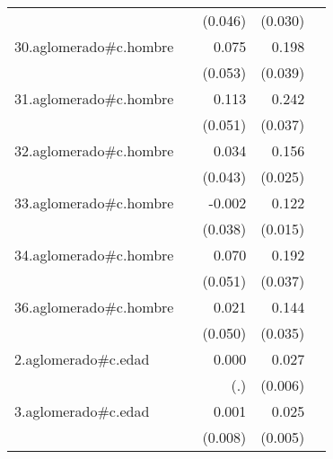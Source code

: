 {\begin{longtable}{l*{4}{D{.}{.}{-1}}}
            &                     &     (0.046)         &     (0.030)         &                     \\
\addlinespace
30.aglomerado#c.hombre&                     &       0.075         &       0.198\sym{***}&                     \\
            &                     &     (0.053)         &     (0.039)         &                     \\
\addlinespace
31.aglomerado#c.hombre&                     &       0.113\sym{*}  &       0.242\sym{***}&                     \\
            &                     &     (0.051)         &     (0.037)         &                     \\
\addlinespace
32.aglomerado#c.hombre&                     &       0.034         &       0.156\sym{***}&                     \\
            &                     &     (0.043)         &     (0.025)         &                     \\
\addlinespace
33.aglomerado#c.hombre&                     &      -0.002         &       0.122\sym{***}&                     \\
            &                     &     (0.038)         &     (0.015)         &                     \\
\addlinespace
34.aglomerado#c.hombre&                     &       0.070         &       0.192\sym{***}&                     \\
            &                     &     (0.051)         &     (0.037)         &                     \\
\addlinespace
36.aglomerado#c.hombre&                     &       0.021         &       0.144\sym{***}&                     \\
            &                     &     (0.050)         &     (0.035)         &                     \\
\addlinespace
2.aglomerado#c.edad&                     &       0.000         &       0.027\sym{***}&                     \\
            &                     &         (.)         &     (0.006)         &                     \\
\addlinespace
3.aglomerado#c.edad&                     &       0.001         &       0.025\sym{***}&                     \\
            &                     &     (0.008)         &     (0.005)         &                     \\

\end{longtable}}
